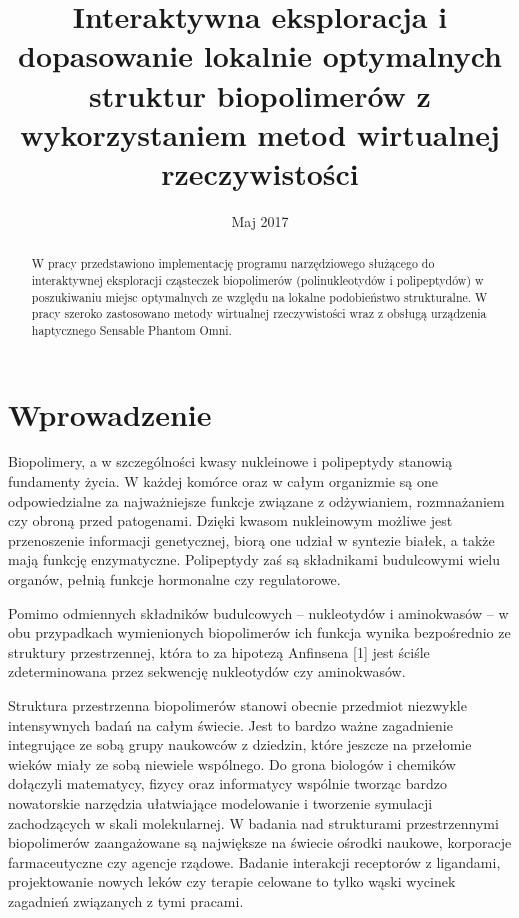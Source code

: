 \documentclass[licencjacka]{pracamgr}
\title{Interaktywna eksploracja i dopasowanie lokalnie optymalnych struktur biopolimerów z wykorzystaniem metod wirtualnej rzeczywistości}
\date{Maj 2017}
\begin{document}
\boldmath		%

\maketitle

\begin{abstract}
W pracy przedstawiono implementację programu narzędziowego służącego do interaktywnej eksploracji cząsteczek biopolimerów (polinukleotydów i polipeptydów) w poszukiwaniu miejsc optymalnych ze względu na lokalne podobieństwo strukturalne. W pracy szeroko zastosowano metody wirtualnej rzeczywistości wraz z obsługą urządzenia haptycznego Sensable Phantom Omni.
\end{abstract}

\tableofcontents

\chapter*{Wprowadzenie}
Biopolimery, a w szczególności kwasy nukleinowe i polipeptydy stanowią fundamenty życia. W każdej komórce oraz w całym organizmie są one odpowiedzialne za najważniejsze funkcje związane z odżywianiem, rozmnażaniem czy obroną przed patogenami. Dzięki kwasom nukleinowym możliwe jest przenoszenie informacji genetycznej, biorą one udział w syntezie białek, a także mają funkcję enzymatyczne. Polipeptydy zaś są składnikami budulcowymi wielu organów, pełnią funkcje hormonalne czy regulatorowe.

Pomimo odmiennych składników budulcowych – nukleotydów i aminokwasów – w obu przypadkach wymienionych biopolimerów ich funkcja wynika bezpośrednio ze struktury przestrzennej, która to za hipotezą Anfinsena [1] jest ściśle zdeterminowana przez sekwencję nukleotydów czy aminokwasów.

Struktura przestrzenna biopolimerów stanowi obecnie przedmiot niezwykle intensywnych badań na całym świecie. Jest to bardzo ważne zagadnienie integrujące ze sobą grupy naukowców z dziedzin, które jeszcze na przełomie wieków miały ze sobą niewiele wspólnego. Do grona biologów i chemików dołączyli matematycy, fizycy oraz informatycy wspólnie tworząc bardzo nowatorskie narzędzia ułatwiające modelowanie i tworzenie symulacji zachodzących w skali molekularnej. W badania nad strukturami przestrzennymi biopolimerów zaangażowane są największe na świecie ośrodki naukowe, korporacje farmaceutyczne czy agencje rządowe. Badanie interakcji receptorów z ligandami, projektowanie nowych leków czy terapie celowane to tylko wąski wycinek zagadnień związanych z tymi pracami.
\end{document}
